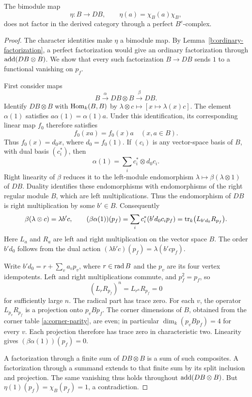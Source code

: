 \begin{lemma}\label{b:trace-obstruction}
The bimodule map
\begin{equation}\label{b:character-map}
 \eta:B\longrightarrow DB,\qquad
 \eta(a)=\chi_B(a)\chi_B,
\end{equation}
does not factor in the derived category through a perfect
\(B^e\)-complex.
\end{lemma}

\begin{proof}
The character identities make \(\eta\) a bimodule map.
By Lemma~\ref{b:ordinary-factorization}, a perfect factorization
would give an ordinary factorization through
\(\operatorname{add}(DB\otimes B)\).  We show that every such factorization
\(B\to DB\) sends \(1\) to a functional vanishing on \(p_f\).

First consider maps
\[
 B\xrightarrow{\alpha}DB\otimes B\xrightarrow{\beta}DB.
\]
Identify \(DB\otimes B\) with \(\operatorname{Hom}_k(B,B)\) by
\(\lambda\otimes c\mapsto[x\mapsto\lambda(x)c]\).
The element \(\alpha(1)\) satisfies
\(a\alpha(1)=\alpha(1)a\).
Under this identification, its corresponding linear map \(f_0\)
therefore satisfies
\[
 f_0(xa)=f_0(x)a\quad(x,a\in B).
\]
Thus \(f_0(x)=d_0x\), where \(d_0=f_0(1)\).
If \((c_i)\) is any vector-space basis of \(B\), with dual basis
\((c_i^*)\), then
\[
 \alpha(1)=\sum_i c_i^*\otimes d_0c_i.
\]
Right linearity of \(\beta\) reduces it to the left-module
endomorphism \(\lambda\mapsto\beta(\lambda\otimes1)\) of \(DB\).
Duality identifies these endomorphisms with endomorphisms of the
right regular module \(B\), which are left multiplications.
Thus the endomorphism of \(DB\) is right multiplication by some
\(b'\in B\).  Consequently
\[
 \beta(\lambda\otimes c)=\lambda b'c,\qquad
 (\beta\alpha(1))(p_f)
   =\sum_i c_i^*(b'd_0c_ip_f)
   =\operatorname{tr}_k\bigl(L_{b'd_0}R_{p_f}\bigr).
\]
Here \(L_a\) and \(R_a\) are left and right multiplication on
the vector space \(B\).  The order \(b'd_0\) follows from the
dual action \((\lambda b'c)(p_f)=\lambda(b'cp_f)\).

Write
\(b'd_0=r+\sum_v a_vp_v\), where \(r\in\operatorname{rad} B\) and the
\(p_v\) are its four vertex idempotents.
Left and right multiplications commute, and \(p_f^2=p_f\), so
\[
 (L_rR_{p_f})^n=L_{r^n}R_{p_f}=0
\]
for sufficiently large \(n\).
The radical part has trace zero.
For each \(v\), the operator \(L_{p_v}R_{p_f}\) is a projection
onto \(p_vBp_f\).  The corner dimensions of \(B\), obtained from
the corner table \eqref{a:corner-parity}, are even; in particular
\(\dim_k(p_vBp_f)=4\) for every \(v\).
Each projection therefore has trace zero in characteristic two.
Linearity gives \((\beta\alpha(1))(p_f)=0\).

A factorization through a finite sum of \(DB\otimes B\) is a sum
of such composites.  A factorization through a summand extends
to that finite sum by its split inclusion and projection.
The same vanishing thus holds throughout \(\operatorname{add}(DB\otimes B)\).
But \(\eta(1)(p_f)=\chi_B(p_f)=1\), a contradiction.
\end{proof}

